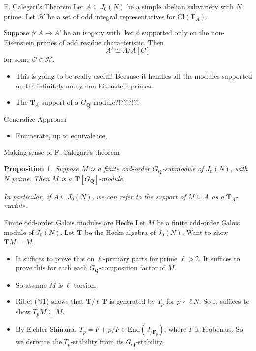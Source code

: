 \documentclass{beamer}
\newtheorem{proposition}[theorem]{Proposition}
\newcommand{\QQ}{\mathbf{Q}}
\newcommand{\TT}{\mathbf{T}}
\newcommand{\F}{\mathbf{F}}
\renewcommand{\H}{\mathcal{H}}
\newcommand{\Cl}{\mathrm{Cl}}
\newcommand{\End}{\mathrm{End}}
\begin{document}
\begin{frame}{F. Calegari's Theorem}
    Let $A\subseteq J_0(N)$ be a simple abelian subvariety with $N$ prime. Let
    $\H$ be a set of odd integral representatives for $\Cl(\TT_A)$.
    \begin{theorem}[F. Calegari]
        Suppose $\phi:A\to A'$ be an isogeny with $\ker\phi$ supported only on the
        non-Eisenstein primes of odd residue characteristic. Then
        \[
            A'\cong A/A[C]
        \]
        for some $C\in \H$.
    \end{theorem}
    \begin{itemize}
        \item
            This is going to be really useful! Because it handles all the
            modules supported on the infinitely many non-Eisenstein primes.
        \item
            The $\TT_A$-support of a $G_\QQ$-module?!??!?!?!
    \end{itemize}
\end{frame}

\begin{frame}{Generalize Approach}
    \begin{itemize}
        \item 
            Enumerate, up to equivalence, 
    \end{itemize}
\end{frame}

\begin{frame}{Making sense of F. Calegari's theorem}
    \begin{proposition}
        Suppose $M$ is a finite odd-order $G_\QQ$-submodule of $J_0(N)$, with $N$
        prime. Then $M$ is a $\TT[G_\QQ]$-module.

        In particular, if $A\subseteq J_0(N)$, we can refer to the support of
        $M\subseteq A$ as a $\TT_A$-module.
    \end{proposition}
\end{frame}

\begin{frame}{Finite odd-order Galois modules are Hecke}
    Let $M$ be a finite odd-order Galois module of $J_0(N)$. Let $\TT$ be the
    Hecke algebra of $J_0(N)$. Want to show $\TT M = M$.
    \begin{itemize}
        \item
            It suffices to prove this on $\ell$-primary parts for prime
            $\ell>2$. It suffices to prove this for each each
            $G_\QQ$-composition factor of $M$.
        \item
            So assume $M$ is $\ell$-torsion.
        \item
            Ribet ('91) shows that $\TT/\ell \TT$ is generated by $T_p$ for
            $p\nmid \ell N$. So it suffices to show $T_p M \subseteq M$.
        \item
            By Eichler-Shimura, $T_p = F+p/F\in \End(J_{/\F_p})$, where $F$ is
            Frobenius. So we derivate the $T_p$-stability from its
            $G_\QQ$-stability.
    \end{itemize}
\end{frame}
\end{document}
